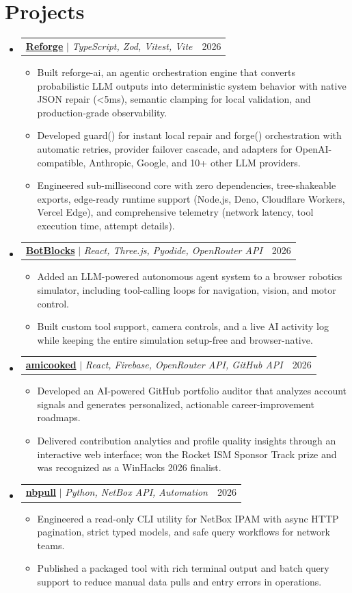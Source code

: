 \documentclass[letterpaper,11pt]{article}
\makeatletter
\newcommand{\resumeItem}[1]{
  \item\small{
    {#1 \vspace{-2pt}}
  }
}
\newcommand{\resumeProjectHeading}[2]{
    \item
    \begin{tabular*}{0.97\textwidth}{l@{\extracolsep{\fill}}r}
      \small#1 & #2 \\
    \end{tabular*}\vspace{-7pt}
}
\newcommand{\resumeSubHeadingListStart}{\begin{itemize}[leftmargin=0.15in, label={}]}
\newcommand{\resumeSubHeadingListEnd}{\end{itemize}\vspace{-8pt}}
\newcommand{\resumeItemListStart}{\begin{itemize}\vspace{-2pt}}
\newcommand{\resumeItemListEnd}{\end{itemize}\vspace{-8pt}}
\makeatother
\begin{document}
\section{Projects}
    \resumeSubHeadingListStart
    \resumeProjectHeading{\href{https://github.com/Champion2005/reforge}{{\textbf{Reforge}}} $|$ \emph{TypeScript, Zod, Vitest, Vite}}{2026}
      \resumeItemListStart
      \resumeItem{Built reforge-ai, an agentic orchestration engine that converts probabilistic LLM outputs into deterministic system behavior with native JSON repair (<5ms), semantic clamping for local validation, and production-grade observability.}
      \resumeItem{Developed guard() for instant local repair and forge() orchestration with automatic retries, provider failover cascade, and adapters for OpenAI-compatible, Anthropic, Google, and 10+ other LLM providers.}
      \resumeItem{Engineered sub-millisecond core with zero dependencies, tree-shakeable exports, edge-ready runtime support (Node.js, Deno, Cloudflare Workers, Vercel Edge), and comprehensive telemetry (network latency, tool execution time, attempt details).}
      \resumeItemListEnd

    \resumeProjectHeading{\href{https://github.com/Champion2005/botblocks}{{\textbf{BotBlocks}}} $|$ \emph{React, Three.js, Pyodide, OpenRouter API}}{2026}
      \resumeItemListStart
      \resumeItem{Added an LLM-powered autonomous agent system to a browser robotics simulator, including tool-calling loops for navigation, vision, and motor control.}
      \resumeItem{Built custom tool support, camera controls, and a live AI activity log while keeping the entire simulation setup-free and browser-native.}
      \resumeItemListEnd

    \resumeProjectHeading{\href{https://github.com/Champion2005/amicooked}{{\textbf{amicooked}}} $|$ \emph{React, Firebase, OpenRouter API, GitHub API}}{2026}
            \resumeItemListStart
      \resumeItem{Developed an AI-powered GitHub portfolio auditor that analyzes account signals and generates personalized, actionable career-improvement roadmaps.}
      \resumeItem{Delivered contribution analytics and profile quality insights through an interactive web interface; won the Rocket ISM Sponsor Track prize and was recognized as a WinHacks 2026 finalist.}
            \resumeItemListEnd

        \resumeProjectHeading{\href{https://github.com/Champion2005/nbpull}{{\textbf{nbpull}}} $|$ \emph{Python, NetBox API, Automation}}{2026}
            \resumeItemListStart
      \resumeItem{Engineered a read-only CLI utility for NetBox IPAM with async HTTP pagination, strict typed models, and safe query workflows for network teams.}
      \resumeItem{Published a packaged tool with rich terminal output and batch query support to reduce manual data pulls and entry errors in operations.}
            \resumeItemListEnd
    \resumeSubHeadingListEnd
\end{document}

